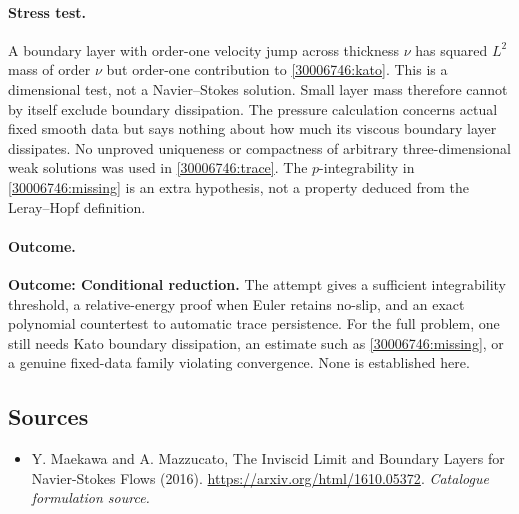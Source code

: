 \documentclass[11pt,a4paper]{article}
\numberwithin{equation}{section}
\begin{document}
\paragraph{Stress test.}
A boundary layer with order-one velocity jump across thickness $\nu$ has
squared $L^2$ mass of order $\nu$ but order-one contribution to
\eqref{30006746:kato}. This is a dimensional test, not a Navier--Stokes solution.
Small layer mass therefore cannot by itself exclude boundary dissipation.
The pressure calculation concerns actual fixed smooth data but says nothing
about how much its viscous boundary layer dissipates. No unproved uniqueness
or compactness of arbitrary three-dimensional weak solutions was used in
\eqref{30006746:trace}. The $p$-integrability in \eqref{30006746:missing} is an extra
hypothesis, not a property deduced from the Leray--Hopf definition.

\paragraph{Outcome.}
\textbf{Outcome: Conditional reduction.}
The attempt gives a sufficient integrability threshold, a relative-energy
proof when Euler retains no-slip, and an exact polynomial countertest to
automatic trace persistence. For the full problem, one still needs Kato
boundary dissipation, an estimate such as \eqref{30006746:missing}, or a genuine
fixed-data family violating convergence. None is established here.

\subsection{Sources}
\begin{itemize}\raggedright
\item[\textnormal{[S1]}]\hypertarget{source:30006746:1}{} Y. Maekawa and A. Mazzucato, The Inviscid Limit and Boundary Layers for Navier-Stokes Flows (2016).
\url{https://arxiv.org/html/1610.05372}.
{\small\textit{Catalogue formulation source.}}

\end{itemize}
\end{document}
